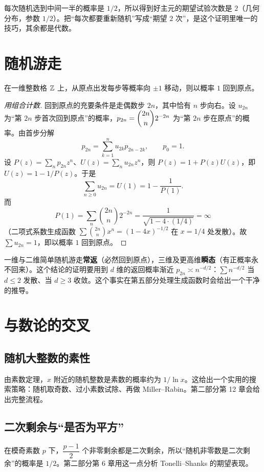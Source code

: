 \begin{teach}
每次随机选到中间一半的概率是 $1/2$，所以得到好主元的期望试验次数是 $2$（几何分布，参数 $1/2$）。把“每次都要重新随机”写成“期望 $2$ 次”，是这个证明里唯一的技巧，其余都是代数。
\end{teach}

\section{随机游走}
\begin{theorem}[一维随机游走常返]
在一维整数格 $\mathbb Z$ 上，从原点出发每步等概率向 $\pm1$ 移动，则以概率 $1$ 回到原点。
\end{theorem}
\begin{proof}[用组合计数]
回到原点的充要条件是走偶数步 $2n$，其中恰有 $n$ 步向右。设 $u_{2n}$ 为“第 $2n$ 步首次回到原点”的概率，$p_{2n}=\dbinom{2n}{n}2^{-2n}$ 为“第 $2n$ 步在原点”的概率。由首步分解
\[
p_{2n}=\sum_{k=1}^{n}u_{2k}p_{2n-2k},\qquad p_0=1.
\]
设 $P(z)=\sum_n p_{2n}z^n$、$U(z)=\sum_n u_{2n}z^n$，则 $P(z)=1+P(z)U(z)$，即 $U(z)=1-1/P(z)$。于是
\[
\sum_{n\ge0}u_{2n}=U(1)=1-\frac1{P(1)}.
\]
而
\[
P(1)=\sum_n\binom{2n}{n}2^{-2n}=\frac1{\sqrt{1-4\cdot(1/4)}}=\infty
\]
（二项式系数生成函数 $\sum\binom{2n}{n}x^n=(1-4x)^{-1/2}$ 在 $x=1/4$ 处发散）。故 $\sum u_{2n}=1$，即以概率 $1$ 回到原点。
\end{proof}

\begin{tip}[维度的分界]
一维与二维简单随机游走\textbf{常返}（必然回到原点），三维及更高维\textbf{瞬态}（有正概率永不回来）。这个结论的证明要用到 $d$ 维的返回概率渐近 $p_{2n}\asymp n^{-d/2}$：$\sum n^{-d/2}$ 当 $d\le2$ 发散、当 $d\ge3$ 收敛。这个事实在第五部分处理生成函数时会给出一个干净的推导。
\end{tip}

\section{与数论的交叉}
\subsection{随机大整数的素性}
由素数定理，$x$ 附近的随机整数是素数的概率约为 $1/\ln x$。这给出一个实用的搜索策略：随机取奇数、过小素数试除、再做 Miller--Rabin。第二部分第 12 章会给出完整流程。

\subsection{二次剩余与“是否为平方”}
在模奇素数 $p$ 下，$\dfrac{p-1}{2}$ 个非零剩余都是二次剩余，所以“随机非零数是二次剩余”的概率是 $1/2$。第二部分第 6 章用这一点分析 Tonelli--Shanks 的期望表现。

